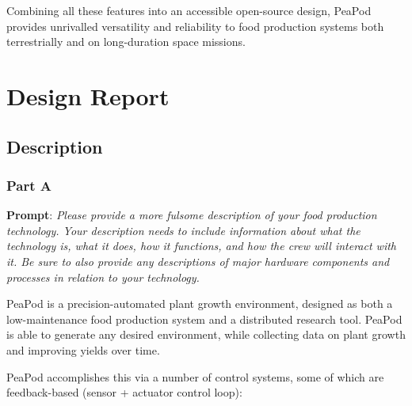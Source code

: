 \documentclass{report}
\begin{document}
Combining all these features into an accessible open-source design, PeaPod provides unrivalled versatility and reliability to food production systems both terrestrially and on long-duration space missions.

\newpage

\section{Design Report}

\subsection{Description}
\label{sec:description}

\subsubsection{Part A}
\label{sec:description-a}

\textbf{Prompt}: \textit{Please provide a more fulsome description of your food production technology. Your description needs to include information about what the technology is, what it does, how it functions, and how the crew will interact with it. Be sure to also provide any descriptions of major hardware components and processes in relation to your technology.}

PeaPod is a precision-automated plant growth environment, designed as both a low-maintenance food production system and a distributed research tool. PeaPod is able to generate any desired environment, while collecting data on plant growth and improving yields over time.

PeaPod accomplishes this via a number of control systems, some of which are feedback-based (sensor + actuator control loop):
\end{document}
